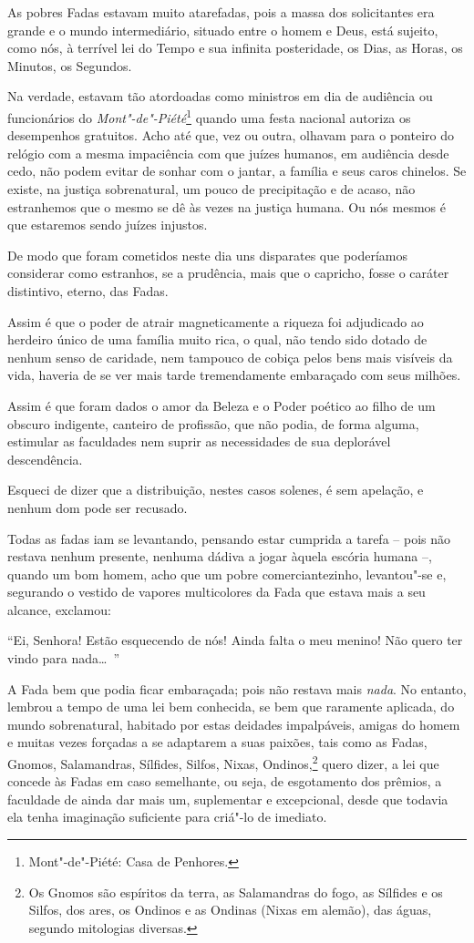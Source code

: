 As pobres Fadas estavam muito atarefadas, pois a massa dos solicitantes
era grande e o mundo intermediário, situado entre o homem e Deus, está
sujeito, como nós, à terrível lei do Tempo e sua infinita
posteridade, os Dias, as Horas, os Minutos, os Segundos.

Na verdade, estavam tão atordoadas como ministros em dia de
audiência ou funcionários do \textit{Mont"-de"-Piété}\protect\footnote{ Mont"-de"-Piété: Casa de Penhores.}
quando uma festa nacional autoriza os desempenhos gratuitos. Acho até que, vez ou outra, olhavam para o ponteiro do relógio com a mesma
impaciência com que juízes humanos, em audiência desde cedo, não
podem evitar de sonhar com o jantar, a família e seus caros
chinelos. Se existe, na justiça sobrenatural, um pouco de precipitação
e de acaso, não estranhemos que o mesmo se dê às vezes na justiça
humana. Ou nós mesmos é que estaremos sendo juízes injustos.

De modo que foram cometidos neste dia uns disparates que poderíamos
considerar como estranhos, se a prudência, mais que o capricho, fosse o
caráter distintivo, eterno, das Fadas.

Assim é que o poder de atrair magneticamente a riqueza foi adjudicado ao
herdeiro único de uma família muito rica, o qual, não tendo sido dotado
de nenhum senso de caridade, nem tampouco de cobiça pelos bens
mais visíveis da vida, haveria de se ver mais tarde tremendamente
embaraçado com seus milhões.

Assim é que foram dados o amor da Beleza e o Poder poético ao filho de um
obscuro indigente, canteiro de profissão, que não podia, de forma
alguma, estimular as faculdades nem suprir as necessidades de sua
deplorável descendência.

Esqueci de dizer que a distribuição, nestes casos solenes, é sem
apelação, e nenhum dom pode ser recusado.

Todas as fadas iam se levantando, pensando estar cumprida a tarefa
– pois não restava nenhum presente, nenhuma dádiva a jogar àquela escória humana –, quando um bom homem, acho que um pobre
comerciantezinho, levantou"-se e, segurando o vestido de vapores
multicolores da Fada que estava mais a seu alcance, exclamou:

“Ei, Senhora! Estão esquecendo de nós! Ainda falta
o meu menino! Não quero ter vindo para nada\ldots\ ”

A Fada bem que podia ficar embaraçada; pois não restava mais \textit{nada}. No
entanto, lembrou a tempo de uma lei bem conhecida, se bem que raramente
aplicada, do mundo sobrenatural, habitado por estas deidades
impalpáveis, amigas do homem e muitas vezes forçadas a se adaptarem a
suas paixões, tais como as Fadas, Gnomos, Salamandras,
Sílfides, Silfos, Nixas, Ondinos,\protect\footnote{ Os Gnomos são espíritos da terra, as Salamandras do fogo, as Sílfides
e os Silfos, dos ares, os Ondinos e as Ondinas (Nixas em alemão), das
águas, segundo mitologias diversas.} quero dizer, a lei que concede às Fadas em
caso semelhante, ou seja, de esgotamento dos prêmios, a
faculdade de ainda dar mais um, suplementar e excepcional, desde que todavia
ela tenha imaginação suficiente para criá"-lo de imediato.

